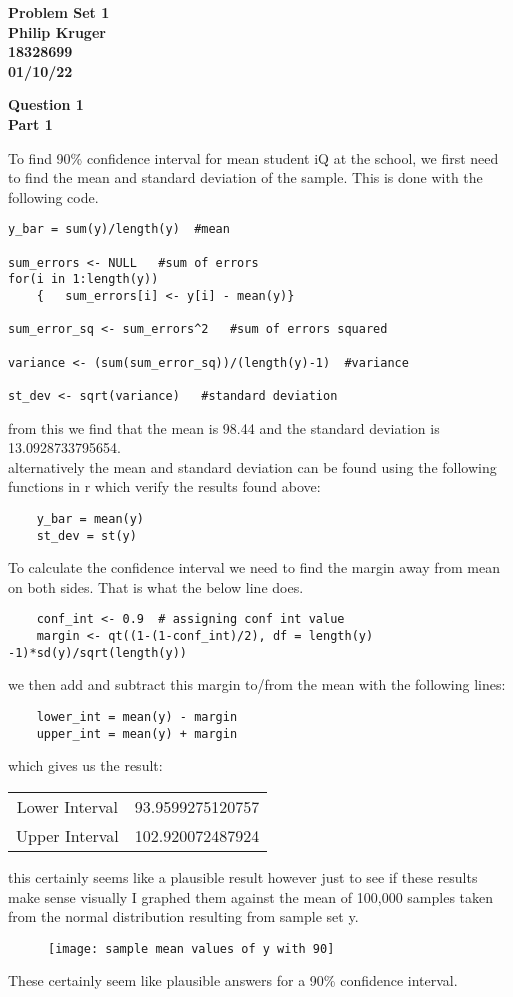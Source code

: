 \documentclass{article}
\begin{document}
\begin{center}
	\textbf{
	{\LARGE Problem Set 1}\\
	Philip Kruger\\
	18328699\\
	01/10/22\\
}
\end{center}
\vspace{10mm}
\textbf{\Large Question 1\\}
\noindent\textbf{\large Part 1\\}

To find 90\% confidence interval for mean student iQ at the school, we first need to find the mean and standard deviation of the sample. This is done with the following code.
\begin{verbatim}
y_bar = sum(y)/length(y)  #mean

sum_errors <- NULL   #sum of errors
for(i in 1:length(y))
	{	sum_errors[i] <- y[i] - mean(y)}

sum_error_sq <- sum_errors^2   #sum of errors squared

variance <- (sum(sum_error_sq))/(length(y)-1)  #variance

st_dev <- sqrt(variance)   #standard deviation
\end{verbatim}
from this we find that the mean is 98.44 and the standard deviation is 
13.0928733795654.\\
alternatively the mean and standard deviation can be found using the following functions in r which verify the results found above:
\begin{verbatim}
	y_bar = mean(y)
	st_dev = st(y)
\end{verbatim}
To calculate the confidence interval we need to find the margin away from mean on both sides. That is what the below line does.
\begin{verbatim}
	conf_int <- 0.9  # assigning conf int value
	margin <- qt((1-(1-conf_int)/2), df = length(y) -1)*sd(y)/sqrt(length(y)) 
\end{verbatim}
we then add and subtract this margin to/from the mean with the following lines:
\begin{verbatim}
	lower_int = mean(y) - margin
	upper_int = mean(y) + margin
\end{verbatim}
which gives us the result:
\begin{center}
	\begin{tabular}{ c c  }
		Lower Interval & 93.9599275120757 \\ 
		Upper Interval & 102.920072487924  
		  
	\end{tabular}
\end{center}
this certainly seems like a plausible result however just to see if these results make sense visually I graphed them against the mean of 100,000 samples taken from the normal distribution resulting from sample set y.
\pagebreak
\begin{figure}[h]
	\centering
	\texttt{[image: sample mean values of y with 90]}
\end{figure}
These certainly seem like plausible answers for a 90\% confidence interval.  \pagebreak
\end{document}
